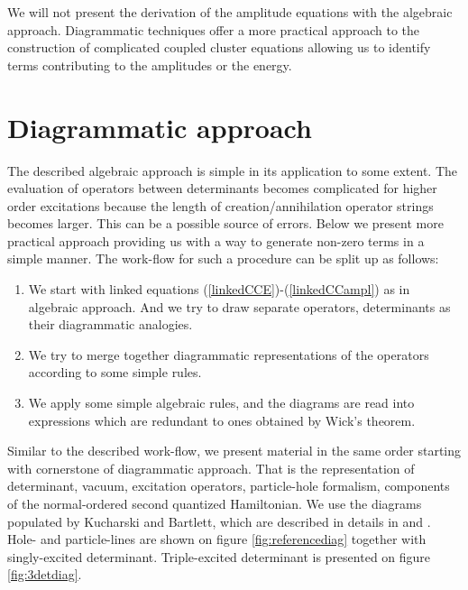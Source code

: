 \documentclass[twoside,english]{uiofysmaster}
\begin{document}
We will not present the derivation of the amplitude equations with the algebraic approach.
Diagrammatic techniques offer a more practical approach to the construction of complicated coupled cluster equations allowing us to identify terms contributing to the amplitudes or the energy.


\section{Diagrammatic approach}

The described algebraic approach is simple in its application to some extent. The evaluation of operators between determinants becomes complicated for higher order excitations because the length of creation/annihilation operator strings becomes larger. This can be a possible source of errors. Below we present more practical approach providing us with a way to generate non-zero terms in a simple manner. The work-flow for such a procedure can be split up as follows:
\begin{enumerate}
	\item We start with linked equations (\ref{linkedCCE})-(\ref{linkedCCampl}) as in algebraic approach. And we try to draw separate operators, determinants as their diagrammatic analogies.
	\item We try to merge together diagrammatic representations of the operators according to some simple rules.
	\item We apply some simple algebraic rules, and the diagrams are read into expressions which are redundant to ones obtained by Wick's theorem.
\end{enumerate}

Similar to the described work-flow, we present material in the same order starting with cornerstone of diagrammatic approach. That is the representation of determinant, vacuum, excitation operators, particle-hole formalism, components of the normal-ordered second quantized Hamiltonian.
We use the diagrams populated by Kucharski and Bartlett, which are described in details in \cite{CrawfordIntroductionCoupledCluster2007} and \cite{HarrisAlgebraicdiagrammaticmethods1992}. Hole- and particle-lines are shown on figure \ref{fig:referencediag} together with singly-excited determinant. Triple-excited determinant is presented on figure \ref{fig:3detdiag}.
\end{document}
